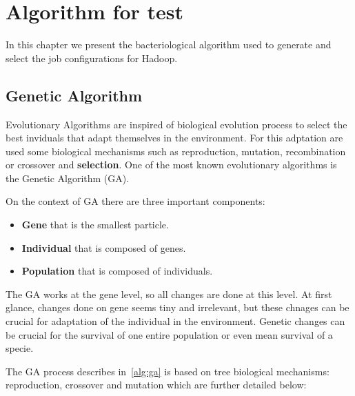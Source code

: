 \chapter{Algorithm for test}
\label{cha:bacAlg}

In this chapter we present the bacteriological algorithm used to generate and
select the job configurations for Hadoop. 

\section{Genetic Algorithm}
\label{subsec:evolutionay_algorithms}
Evolutionary Algorithms are inspired of biological evolution process to select
the best inviduals that adapt themselves in the environment. For this adptation
are used some biological mechanisms such as reproduction, mutation, recombination
or crossover and \textbf{selection}. One of the most known evolutionary algorithms
is the Genetic Algorithm (GA). 


On the context of GA there are three important components:
\begin{itemize}
    \item \textbf{Gene} that is the smallest particle.
    \item \textbf{Individual} that is composed of genes.
    \item \textbf{Population} that is composed of individuals.
\end{itemize}

The GA works at the gene level, so all changes are done at this level. At first
glance, changes done on gene seems tiny and irrelevant, but these chnages can
be crucial for adaptation of the individual in the environment. Genetic changes
can be crucial for the survival of one entire population or even mean survival
of a specie.


The GA process describes in~\ref{alg:ga} is based on tree biological
mechanisms: reproduction, crossover and mutation which are further detailed below:

